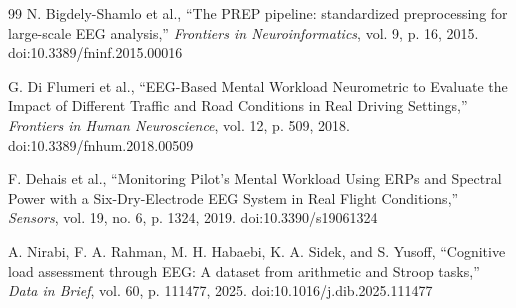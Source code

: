 \documentclass[10pt]{iopart}
\begin{document}
\begin{thebibliography}{99}
N. Bigdely-Shamlo et al.,
``The PREP pipeline: standardized preprocessing for large-scale EEG analysis,''
\emph{Frontiers in Neuroinformatics}, vol. 9, p. 16, 2015.
doi:10.3389/fninf.2015.00016

G. Di Flumeri et al.,
``EEG-Based Mental Workload Neurometric to Evaluate the Impact of Different Traffic and Road Conditions in Real Driving Settings,''
\emph{Frontiers in Human Neuroscience}, vol. 12, p. 509, 2018.
doi:10.3389/fnhum.2018.00509

F. Dehais et al.,
``Monitoring Pilot's Mental Workload Using ERPs and Spectral Power with a Six-Dry-Electrode EEG System in Real Flight Conditions,''
\emph{Sensors}, vol. 19, no. 6, p. 1324, 2019.
doi:10.3390/s19061324

A. Nirabi, F. A. Rahman, M. H. Habaebi, K. A. Sidek, and S. Yusoff,
``Cognitive load assessment through EEG: A dataset from arithmetic and Stroop tasks,''
\emph{Data in Brief}, vol. 60, p. 111477, 2025.
doi:10.1016/j.dib.2025.111477

\end{thebibliography}
\end{document}
